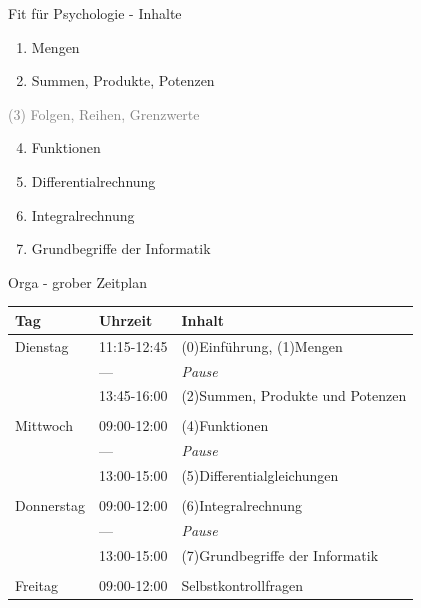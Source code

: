 \documentclass[
  8pt,
  ignorenonframetext,
  t]{beamer}
\begin{document}
\begin{frame}{Fit für Psychologie - Inhalte}
\protect\hypertarget{fit-fuxfcr-psychologie---inhalte}{}
\large
\vfill

\begin{enumerate}
[(1)]
\item
  Mengen
\item
  Summen, Produkte, Potenzen
\end{enumerate}

\textcolor{gray}{(3) Folgen, Reihen, Grenzwerte}

\begin{enumerate}
[(1)]
\setcounter{enumi}{3}
\item
  Funktionen
\item
  Differentialrechnung
\item
  Integralrechnung
\item
  Grundbegriffe der Informatik \vfill
\end{enumerate}
\end{frame}

\begin{frame}{Orga - grober Zeitplan}
\protect\hypertarget{orga---grober-zeitplan}{}
\vspace{12mm}

\small

\begin{longtable}[]{@{}lll@{}}
\toprule()
Tag & Uhrzeit & Inhalt \\
\midrule()
\endhead
Dienstag & 11:15-12:45 & (0)Einführung, (1)Mengen \\
& --- & \emph{Pause} \\
& 13:45-16:00 & (2)Summen, Produkte und Potenzen \\
& & \\
Mittwoch & 09:00-12:00 & (4)Funktionen \\
& --- & \emph{Pause} \\
& 13:00-15:00 & (5)Differentialgleichungen \\
& & \\
Donnerstag & 09:00-12:00 & (6)Integralrechnung \\
& --- & \emph{Pause} \\
& 13:00-15:00 & (7)Grundbegriffe der Informatik \\
& & \\
Freitag & 09:00-12:00 & Selbstkontrollfragen \\
\bottomrule()
\end{longtable}
\end{frame}
\end{document}
